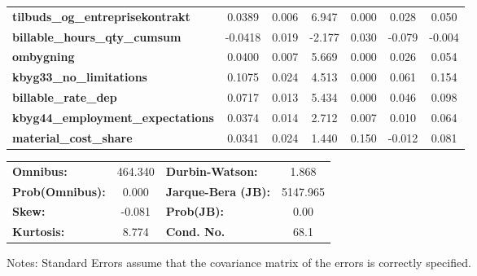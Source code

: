 \begin{center}
\begin{tabular}{lcccccc}
\textbf{tilbuds\_og\_entreprisekontrakt}  &       0.0389  &        0.006     &     6.947  &         0.000        &        0.028    &        0.050     \\
\textbf{billable\_hours\_qty\_cumsum}     &      -0.0418  &        0.019     &    -2.177  &         0.030        &       -0.079    &       -0.004     \\
\textbf{ombygning}                        &       0.0400  &        0.007     &     5.669  &         0.000        &        0.026    &        0.054     \\
\textbf{kbyg33\_no\_limitations}          &       0.1075  &        0.024     &     4.513  &         0.000        &        0.061    &        0.154     \\
\textbf{billable\_rate\_dep}              &       0.0717  &        0.013     &     5.434  &         0.000        &        0.046    &        0.098     \\
\textbf{kbyg44\_employment\_expectations} &       0.0374  &        0.014     &     2.712  &         0.007        &        0.010    &        0.064     \\
\textbf{material\_cost\_share}            &       0.0341  &        0.024     &     1.440  &         0.150        &       -0.012    &        0.081     \\
\bottomrule
\end{tabular}
\begin{tabular}{lclc}
\textbf{Omnibus:}       & 464.340 & \textbf{  Durbin-Watson:     } &    1.868  \\
\textbf{Prob(Omnibus):} &   0.000 & \textbf{  Jarque-Bera (JB):  } & 5147.965  \\
\textbf{Skew:}          &  -0.081 & \textbf{  Prob(JB):          } &     0.00  \\
\textbf{Kurtosis:}      &   8.774 & \textbf{  Cond. No.          } &     68.1  \\
\bottomrule
\end{tabular}
\end{center}

Notes: \newline
 [1] Standard Errors assume that the covariance matrix of the errors is correctly specified.